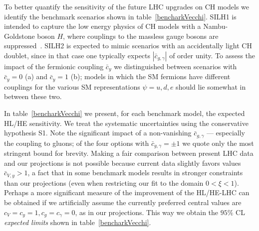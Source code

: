 To better quantify the sensitivity of the future LHC upgrades on CH models we identify the benchmark scenarios shown in table~\ref{bencharkVecchi}. SILH1 is intended to capture the low energy physics of CH models with a Nambu-Goldstone boson $H$, where couplings to the massless gauge bosons are suppressed~\cite{Giudice:2007fh}. SILH2 is expected to mimic scenarios with an accidentally light CH doublet, since in that case one typically expects $|\bar c_{g,\gamma}|$ of order unity. To assess the impact of the fermionic coupling $\bar c_y$ we distinguished between scenarios with $\bar c_y=0$ (a) and $\bar c_y=1$ (b); models in which the SM fermions have different couplings for the various SM representations $\psi=u,d,e$ should lie somewhat in between these two. 


In table~\ref{bencharkVecchi} we present, for each benchmark model, the expected HL/HE sensitivity. We treat the systematic uncertainties using the conservative hypothesis S1. Note the significant impact of a non-vanishing $\bar c_{g,\gamma}$ --- especially the coupling to gluons; of the four options with $\bar c_{g,\gamma}=\pm1$ we quote only the most stringent bound for brevity. Making a fair comparison between present LHC data and our projections is not possible because current data slightly favors values $\bar c_{V,y}>1$, a fact that in some benchmark models results in stronger constraints than our projections (even when restricting our fit to the domain $0<\xi<1$). Perhaps a more significant measure of the improvement of the HL/HE-LHC can be obtained if we artificially assume the currently preferred central values are $c_V=c_y=1, c_g=c_\gamma=0$, as in our projections. This way we obtain the $95\%$ CL {\emph{expected limits}} shown in table~\ref{bencharkVecchi}.





